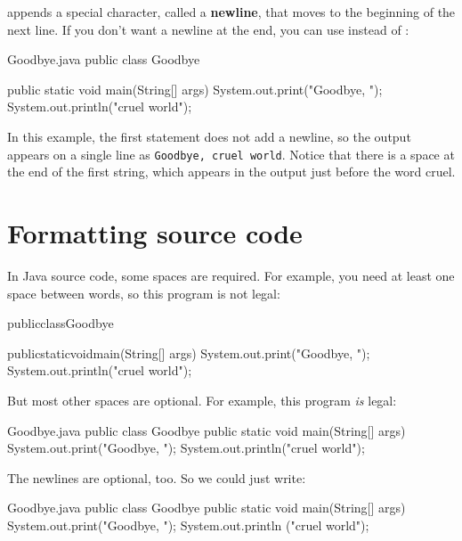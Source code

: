 
 appends a special character, called a {\bf newline}, that moves to the beginning of the next line.
If you don't want a newline at the end, you can use  instead of :

\begin{trinket}[235]{Goodbye.java}
public class Goodbye {

    public static void main(String[] args) {
        System.out.print("Goodbye, ");
        System.out.println("cruel world");
    }
}
\end{trinket}

\label{goodbye}

In this example, the first statement does not add a newline, so the output appears on a single line as {\tt Goodbye, cruel world}.
Notice that there is a space at the end of the first string, which appears in the output just before the word cruel.


\section{Formatting source code}
\label{formatting}

In Java source code, some spaces are required.
For example, you need at least one space between words, so this program is not legal:

\begin{code}
publicclassGoodbye{

    publicstaticvoidmain(String[] args) {
        System.out.print("Goodbye, ");
        System.out.println("cruel world");
    }
}
\end{code}

But most other spaces are optional.
For example, this program {\em is} legal:

\begin{trinket}[220]{Goodbye.java}
public class Goodbye {
public static void main(String[] args) {
System.out.print("Goodbye, ");
System.out.println("cruel world");
}
}
\end{trinket}

The newlines are optional, too.
So we could just write:

\begin{trinket}[175]{Goodbye.java}
public class Goodbye { public static void main(String[] args)
{ System.out.print("Goodbye, "); System.out.println
("cruel world");}}
\end{trinket}

